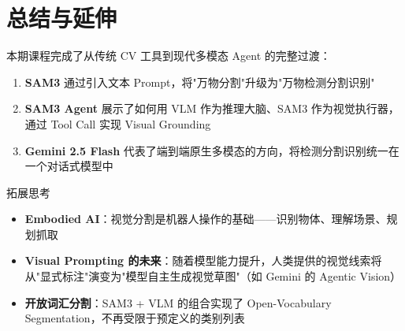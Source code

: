 \section{总结与延伸}

本期课程完成了从传统 CV 工具到现代多模态 Agent 的完整过渡：

\begin{enumerate}
    \item \textbf{SAM3} 通过引入文本 Prompt，将"万物分割"升级为"万物检测分割识别"
    \item \textbf{SAM3 Agent} 展示了如何用 VLM 作为推理大脑、SAM3 作为视觉执行器，通过 Tool Call 实现 Visual Grounding
    \item \textbf{Gemini 2.5 Flash} 代表了端到端原生多模态的方向，将检测分割识别统一在一个对话式模型中
\end{enumerate}

\begin{knowledgebox}{拓展思考}
\begin{itemize}
    \item \textbf{Embodied AI}：视觉分割是机器人操作的基础——识别物体、理解场景、规划抓取
    \item \textbf{Visual Prompting 的未来}：随着模型能力提升，人类提供的视觉线索将从"显式标注"演变为"模型自主生成视觉草图"（如 Gemini 的 Agentic Vision）
    \item \textbf{开放词汇分割}：SAM3 + VLM 的组合实现了 Open-Vocabulary Segmentation，不再受限于预定义的类别列表
\end{itemize}
\end{knowledgebox}



